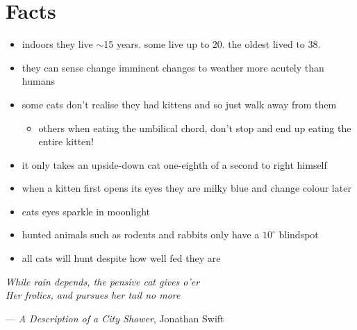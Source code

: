 \documentclass{article}
\begin{document}
\section*{Facts}
\begin{itemize}
    \item indoors they live $\sim$15 years. some live up to 20. the oldest lived to 38.
    \item they can sense change imminent changes to weather more acutely than humans
    \item some cats don't realise they had kittens and so just walk away from them
        \begin{itemize}
            \item others when eating the umbilical chord, don't stop and end up eating the entire kitten!
        \end{itemize}
    \item it only takes an upside-down cat one-eighth of a second to right himself
    \item when a kitten first opens its eyes they are milky blue and change colour later
    \item cats eyes sparkle in moonlight
    \item hunted animals such as rodents and rabbits only have a \(10^\circ\) blindspot
    \item all cats will hunt despite how well fed they are
\end{itemize}

\begin{flushright}
    \begin{minipage}{9cm}
        \flushleft
        \emph{While rain depends, the pensive cat gives o'er\\
            Her frolics, and pursues her tail no more}
    \end{minipage}
    \begin{flushright}--- \emph{A Description of a City Shower}, Jonathan Swift\end{flushright}
\end{flushright}
\end{document}
